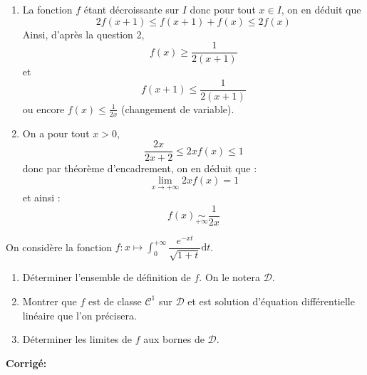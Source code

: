 \documentclass[a4paper,twoside,french,11pt]{VcCours}
\newcommand{\dt}{\text{d}t}
\newcommand{\corr}{\textbf{Corrigé:}}
\begin{document}
\begin{enumerate}
	\item La fonction $f$ étant décroissante sur $I$ donc pour tout $x \in I$, on en déduit que 
	$$2f(x+1) \le f(x+1)+f(x) \le 2f(x)$$
Ainsi, d'après la question 2, 
$$f(x)\ge \frac1{2(x+1)}$$
 et $$f(x+1) \le \frac1{2(x+1)}$$
ou encore $f(x) \le \frac1{2x}$ (changement de variable).

	\item On a pour tout $x>0$,
$$\frac{2x}{2x+2} \le 2xf(x) \le 1$$ 
donc par théorème d'encadrement, on en déduit que :
$$\lim\limits_{x\to+\infty}2xf(x)=1$$
et ainsi :
$$ f(x) \underset{+\infty}\sim \frac1{2x}$$
	\end{enumerate}



\begin{Exercice}{} On considère la fonction $f : x \mapsto \int_0^{+ \infty} \dfrac{e^{-xt}}{\sqrt{1+t}} \dt$.
\begin{enumerate}
\item Déterminer l'ensemble de définition de $f$. On le notera $\mathcal{D}$.
\item Montrer que $f$ est de classe $\mathcal{C}^1$ sur $\mathcal{D}$ et est solution d'équation différentielle linéaire que l'on précisera.
\item Déterminer les limites de $f$ aux bornes de $\mathcal{D}$.
\end{enumerate}
\end{Exercice}

\corr 
\end{document}

